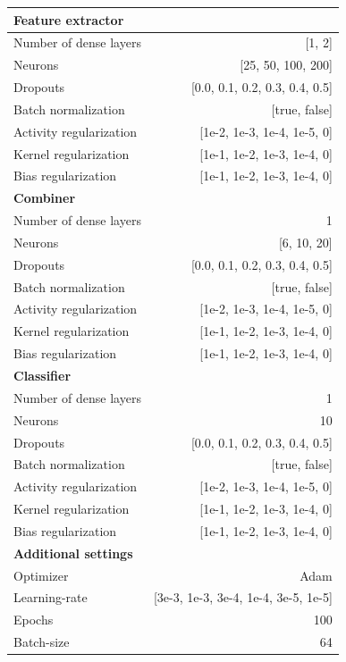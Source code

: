 \documentclass[preprint]{elsarticle}
\begin{document}
\renewcommand{\arraystretch}{1.2}
\begin{table}[H]
  \centering
  \scriptsize
\begin{adjustbox}{center}
\begin{tabular}{@{}lr@{}}
\toprule
\textbf{Feature extractor}  & \\
\midrule
{Number of dense layers}    & [1, 2] \\
{Neurons}                   & [25, 50, 100, 200] \\
{Dropouts}                  & [0.0, 0.1, 0.2, 0.3, 0.4, 0.5] \\
{Batch normalization}       & [true, false] \\
{Activity regularization}   & [1e-2, 1e-3, 1e-4, 1e-5, 0] \\
{Kernel regularization}     & [1e-1, 1e-2, 1e-3, 1e-4, 0] \\
{Bias regularization}       & [1e-1, 1e-2, 1e-3, 1e-4, 0] \\
\midrule
\textbf{Combiner}           & \\
\midrule
{Number of dense layers}    & 1 \\
{Neurons}                   & [6, 10, 20] \\
{Dropouts}                  & [0.0, 0.1, 0.2, 0.3, 0.4, 0.5] \\
{Batch normalization}       & [true, false] \\
{Activity regularization}   & [1e-2, 1e-3, 1e-4, 1e-5, 0] \\
{Kernel regularization}     & [1e-1, 1e-2, 1e-3, 1e-4, 0] \\
{Bias regularization}       & [1e-1, 1e-2, 1e-3, 1e-4, 0] \\
\midrule
\textbf{Classifier}         & \\
\midrule
{Number of dense layers}    & 1 \\
{Neurons}                   & 10 \\
{Dropouts}                  & [0.0, 0.1, 0.2, 0.3, 0.4, 0.5] \\
{Batch normalization}       & [true, false] \\
{Activity regularization}   & [1e-2, 1e-3, 1e-4, 1e-5, 0] \\
{Kernel regularization}     & [1e-1, 1e-2, 1e-3, 1e-4, 0] \\
{Bias regularization}       & [1e-1, 1e-2, 1e-3, 1e-4, 0] \\
\midrule
\textbf{Additional settings} & \\
\midrule
Optimizer                   & Adam \\
Learning-rate               & [3e-3, 1e-3, 3e-4, 1e-4, 3e-5, 1e-5] \\
Epochs                      & 100 \\
Batch-size                  & 64 \\


\end{tabular}
\end{adjustbox}
\end{table}
\end{document}

